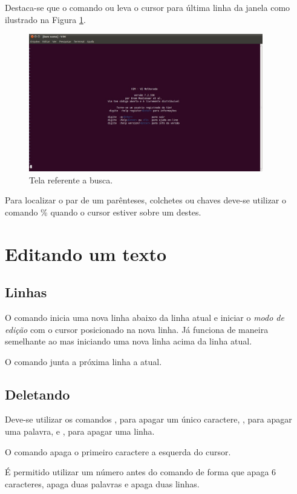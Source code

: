 Destaca-se que o comando \lcode{/} ou  leva o cursor para última linha da janela como ilustrado na Figura \ref{fig:vim_search_screen}.
\begin{figure}[h!]
    \centering
    \includegraphics[height=6cm]{figures/vim_search_screen}
    \caption{Tela referente a busca.}
    \label{fig:vim_search_screen}
\end{figure}

Para localizar o par de um parênteses, colchetes ou chaves deve-se utilizar o comando \% quando o cursor estiver sobre um destes.

\section{Editando um texto}
\subsection{Linhas}
O comando  inicia uma nova linha abaixo da linha atual e iniciar o \textit{modo de edição} com o cursor posicionado na nova linha. Já  funciona de maneira semelhante ao  mas iniciando uma nova linha acima da linha atual.

O comando  junta a próxima linha a atual.

\subsection{Deletando}
Deve-se utilizar os comandos , para apagar um único caractere, , para apagar uma palavra, e , para apagar uma linha.

O comando  apaga o primeiro caractere a esquerda do cursor.

É permitido utilizar um número antes do comando de forma que  apaga 6 caracteres,   apaga duas palavras e \lcode{2dd} apaga duas linhas.

